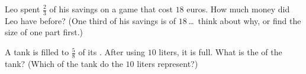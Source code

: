 \begin{exercise}[$\star\star$]\label{exo:g6:fractions:11}
Leo spent $\frac23$ of his savings on a game that cost $18$ euros. How
much money did Leo have before? (One third of his savings is  of
$18$\,\dots\ think about why, or find the size of one part first.)
\end{exercise}

\begin{exercise}[$\star\star\star$]\label{exo:g6:fractions:12}
A tank is filled to $\frac58$ of its . After using $10$ liters,
it is  full. What is the  of the tank? (Which  of
the tank do the $10$ liters represent?)
\end{exercise}
